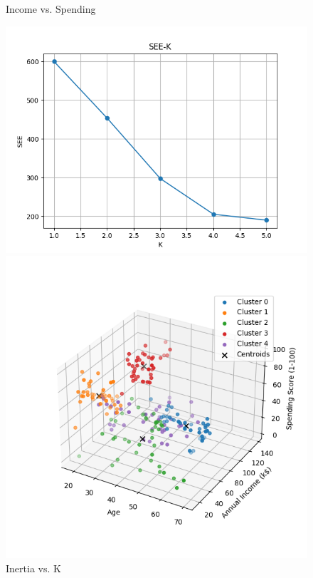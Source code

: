 \documentclass[8pt]{article}
\begin{document}
\begin{figure}[H]
\begin{minipage}{0.32\textwidth}
        \caption{Income vs. Spending}
        \label{fig: Annual Income vs. Spending Score k4 com con min20}
    \end{minipage}
    \hfill
\end{figure}

\begin{figure}[H]
    \centering
    \begin{minipage}{0.32\textwidth}
        \centering
        \includegraphics[width=\textwidth]{./Prob4/out/task3_2_com/SEE-K.png}
        \caption{Inertia vs. K}
        \label{fig: Inertia vs. K com min20}
    \end{minipage}
    \hfill
    \begin{minipage}{0.32\textwidth}
        \centering
        \includegraphics[width=\textwidth]{./Prob4/out/task3_2_com/images/cluster_result_k5_3d.png}

\end{minipage}
\end{figure}
\end{document}
